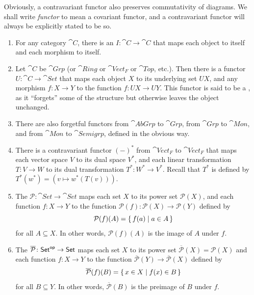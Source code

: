 Obviously, a contravariant functor also preserves commutativity of diagrams. We shall write \emph{functor} to mean a covariant functor, and a contravariant functor will always be explicitly stated to be so.

\begin{Example}
\begin{enumerate}
\item For any category $\cat C$, there is an  $I \colon \cat C \to \cat C$ that maps each object to itself and each morphism to itself.

\item Let $\cat C$ be $\cat{Grp}$ (or $\cat{Ring}$ or $\cat{Vect}_F$ or $\cat{Top}$, etc.). Then there is a functor $U \colon \cat C \to \cat{Set}$ that maps each object $X$ to its underlying set $UX$, and any morphism $f \colon X \to Y$ to the function $f \colon UX \to UY$. This functor is said to be a , as it ``forgets'' some of the structure but otherwise leaves the object unchanged.

\item There are also forgetful functors from $\cat{AbGrp}$ to $\cat{Grp}$, from $\cat{Grp}$ to $\cat{Mon}$, and from $\cat{Mon}$ to $\cat{Semigrp}$, defined in the obvious way.

\item There is a contravariant functor $(-)^*$ from $\cat{Vect}_F$ to $\cat{Vect}_F$ that maps each vector space $V$ to its dual space $V^*$, and each linear transformation $T \colon V \to W$ to its dual transformation $T^* \colon W^* \to V^*$. Recall that $T^*$ is defined by $T^*(w^*) = (v \mapsto w^*(T(v)))$.

\item The  $\mathcal P \colon \cat{Set} \to \cat{Set}$ maps each set $X$ to its power set $\mathcal P(X)$, and each function $f \colon X \to Y$ to the function $\mathcal P(f) \colon \mathcal P(X) \to \mathcal P(Y)$ defined by
\begin{equation*}
\mathcal P(f)(A) = \qty{\, f(a) \mid a \in A \,}
\end{equation*}
for all $A \subseteq X$. In other words, $\mathcal P(f)(A)$ is the image of $A$ under $f$.

\item The  $\overline{\mathcal P} \colon \mathsf{Set}^\mathsf{op} \to \mathsf{Set}$ maps each set $X$ to its power set $\overline{\mathcal P}(X) = \mathcal P(X)$ and each function $f \colon X \to Y$ to the function $\overline{\mathcal P}(Y) \to \overline{\mathcal P}(X)$ defined by
\begin{equation*}
\overline{\mathcal P}(f)(B) = \qty{\, x \in X \mid f(x) \in B \,}
\end{equation*}
for all $B \subseteq Y$. In other words, $\overline{\mathcal P}(B)$ is the preimage of $B$ under $f$.


\end{enumerate}
\end{Example}
